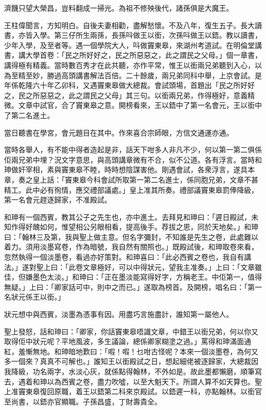 \documentclass[a5paper, 12pt, openany]{book} %
\begin{document}
	濟饑只望大榮昌，豈料翻成一掃光。為祖不修殃後代，諸孫俱是大魔王。

	王柱偉聞言，方知明白。自後夫妻相勸，盡解愁懷。不及八年，復生五子。長大讀書，亦皆入學。第三仔所生兩孫，長孫呌做王以銜，次孫呌做王以鋙。教以讀書，少年入學，及至者等。遇一個學院大人，呌做竇東皋，來湖州考道試。在明倫堂講書，講大學首卷：「民之所好好之，民之所惡惡之，此之謂民之父母。」個一章書，講得極有精義。當時數百秀才在此共聽，亦作平常，惟王以銜兩兄弟聽到入心，以為至精至妙，勝過高頭講書解法百倍。二十餘歲，兩兄弟同科中舉，上京會試。是年係乾隆六十年乙卯科，又遇竇東皋做大總裁。會試頭場，首題出「民之所好好之，民之所惡惡之，此之謂民之父母」其三句。以銜兩兄弟，作得極好，意義精微。文章中試官，合了竇東皋之意。開榜看來，王以鋙中了第一名會元，王以銜中了第二名進土。

	當日聽書在學宮，會元題目在其中。作來喜合宗師眼，方信文通運亦通。

	當時各舉人，有不能中得者造起是非，話天下咁多人非凡不少，何以第一第二俱係佢兩兄弟中埋？況文字意思，與高頭講章微有不合，似不公道。各有浮言。當時和珅做奸宰相，素與竇東皋不睦，時時想陰謀害他。剛遇會試，各衆浮言，遂具本章，奏之皇上話：「竇東皋今科會試所取第一第二名進士，係同胞兄弟，文章不甚精工。此中必有徇情，應交禮部議處。」皇上准其所奏。禮部議竇東皋罰俸降級，第一名會元趕逐歸家，不准殿試。

	和珅有一個西賓，教其公子之先生也，亦中進土。去拜見和珅曰：「遲日殿試，未知作得好醜如何，惟望相公另眼相看，提高後手。荐拔之恩，同於天地矣。」和珅曰：「翰林三及第，我與聖上做主意。但名字彌封，不知誰是先生之卷，此處難以着力。須用淡墨寫卷，作為暗號，我自然有關照也。」既殿試後，和珅取卷來看，忽然執得一個淡墨卷，看過亦好策對。和珅喜曰：「此必西賓之卷也，我自有講法。」遂對聖上曰：「此卷文章極好，可以中得狀元，望我主准奏。」上曰：「文章雖佳，但嫌墨色太淡。」和珅曰：「正在墨淡能寫得好字，方稱老王。中佢第一，值得無疑。」上曰：「卿家話可中，則中之而已。」遂取為榜首。及開榜，唱名曰：「第一名狀元係王以銜。」

	狀元想中與西賓，淡墨為憑事有因。用盡巧言施盡計，誰知第一屬他人。

	聖上發怒，話和珅曰：「卿家，你話竇東皋唔識文章，中錯王以銜兄弟，何以你又取得佢中狀元呢？平地風波，多生議論，總係卿家糊塗之過。」罵得和珅滿面通紅，羞慚無地。和珅暗地歎曰：「㗇！㗇！乜咁古怪呢？本來一個淡墨卷，為何又多一個來？真真不可解也。」誰知王以銜殿試之日，想起細佬被逐歸家，大總裁因我降級，功名兩字，水淡心灰，就係點得翰林，不外如是。故此墨都懶磨，順筆寫去，遇着和珅以為西賓之卷，盡力吹噓，以至大魁天下。所謂人算不如天算也。聖上准竇東皋復回原職，着王以鋙第二科來京殿試。以鋙遲一科，亦點翰林。以銜官至尚書，以鋙亦官顯職。子孫昌盛，丁財壽貴全。
\end{document}
